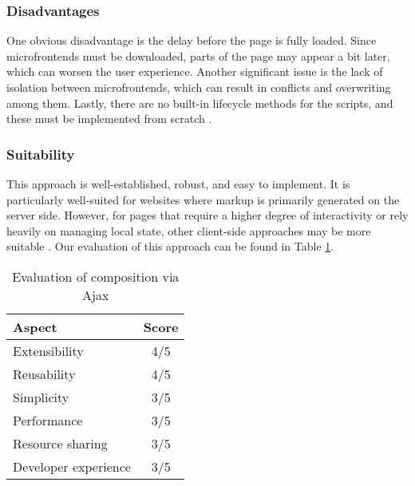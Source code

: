 \subsubsection{Disadvantages}
One obvious disadvantage is the delay before the page is fully loaded. Since microfrontends must be downloaded, parts of the page may appear a bit later, which can worsen the user experience. Another significant issue is the lack of isolation between microfrontends, which can result in conflicts and overwriting among them. Lastly, there are no built-in lifecycle methods for the scripts, and these must be implemented from scratch \cite{Geers}.

\subsubsection{Suitability}
This approach is well-established, robust, and easy to implement. It is particularly well-suited for websites where markup is primarily generated on the server side. However, for pages that require a higher degree of interactivity or rely heavily on managing local state, other client-side approaches may be more suitable \cite{Geers}. Our evaluation of this approach can be found in Table \ref{table:ajax-evaluation}.
\begin{table}[h]
  \centering
  \begin{tabular}{|p{4cm}|c|}
    \hline
      \textbf{Aspect} & \textbf{Score} \\
    \hline
      Extensibility & 4/5 \\
    \hline
      Reusability & 4/5 \\
    \hline
      Simplicity & 3/5 \\
    \hline
      Performance & 3/5 \\
    \hline
      Resource sharing & 3/5 \\
    \hline
      Developer experience & 3/5 \\
    \hline
  \end{tabular}
  \caption{Evaluation of composition via Ajax}
  \label{table:ajax-evaluation}
\end{table}


